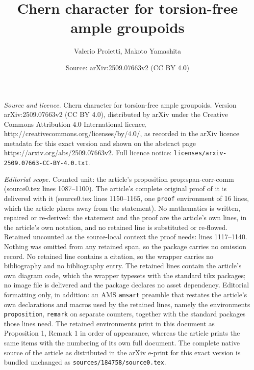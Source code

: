 \documentclass[10pt,a4paper]{amsart}
\title{Chern character for torsion-free ample groupoids}
\author{Valerio Proietti, Makoto Yamashita}
\date{Source: arXiv:2509.07663v2 (CC BY 4.0)}
\begin{document}
\maketitle

\noindent\emph{Source and licence.} Chern character for torsion-free ample groupoids. Version arXiv:2509.07663v2 (CC BY 4.0), distributed by arXiv under the Creative Commons Attribution 4.0 International licence, http://creativecommons.org/licenses/by/4.0/, as recorded in the arXiv licence metadata for this exact version and shown on the abstract page https://arxiv.org/abs/2509.07663v2. Full licence notice: \texttt{licenses/arxiv-2509.07663-CC-BY-4.0.txt}.\par\smallskip

\noindent\textit{Editorial scope.} Counted unit: the article's proposition prop:span-corr-comm (source0.tex lines 1087--1100). The article's complete original proof of it is delivered with it (source0.tex lines 1150--1165, one \texttt{proof} environment of 16 lines, which the article places away from the statement). No mathematics is written, repaired or re-derived: the statement and the proof are the article's own lines, in the article's own notation, and no retained line is substituted or re-flowed.  Retained uncounted as the source-local context the proof needs: lines 1117--1140.  Nothing was omitted from any retained span, so the package carries no omission record.  No retained line contains a citation, so the wrapper carries no bibliography and no bibliography entry.  The retained lines contain the article's own diagram code, which the wrapper typesets with the standard tikz packages; no image file is delivered and the package declares no asset dependency.  Editorial formatting only, in addition: an AMS \texttt{amsart} preamble that restates the article's own declarations and macros used by the retained lines, namely the environments \texttt{proposition}, \texttt{remark} on separate counters, together with the standard packages those lines need.  The retained environments print in this document as Proposition 1, Remark 1 in order of appearance, whereas the article prints the same items with the numbering of its own full document.  The complete native source of the article as distributed in the arXiv e-print for this exact version is bundled unchanged as \texttt{sources/184758/source0.tex}.
\end{document}
